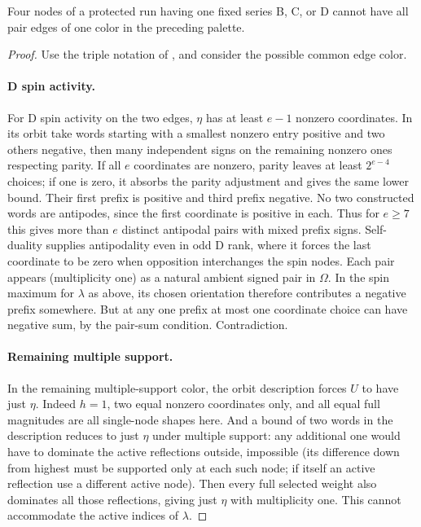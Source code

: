 \begin{proposition}\label{w:signed-obstruction}
Four nodes of a protected run having one fixed series B, C, or D cannot have all pair edges of one color in the preceding palette.
\end{proposition}
\begin{proof}
Use the triple notation of , and consider the possible common edge color.

\paragraph{D spin activity.} For D spin activity on the two edges, \(\eta\) has at least \(e-1\) nonzero coordinates. In its orbit take words starting with a smallest nonzero entry positive and two others negative, then many independent signs on the remaining nonzero ones respecting parity. If all $e$ coordinates are nonzero, parity leaves at least $2^{e-4}$ choices; if one is zero, it absorbs the parity adjustment and gives the same lower bound. Their first prefix is positive and third prefix negative. No two constructed words are antipodes, since the first coordinate is positive in each. Thus for $e\ge7$ this gives more than $e$ distinct antipodal pairs with mixed prefix signs. Self-duality supplies antipodality even in odd D rank, where it forces the last coordinate to be zero when opposition interchanges the spin nodes. Each pair appears (multiplicity one) as a natural ambient signed pair in \(\Omega\). In the spin maximum for \(\lambda\) as above, its chosen orientation therefore contributes a negative prefix somewhere. But at any one prefix at most one coordinate choice can have negative sum, by the pair-sum condition. Contradiction.

\paragraph{Remaining multiple support.} In the remaining multiple-support color, the orbit description forces \(U\) to have just \(\eta\). Indeed \(h=1\), two equal nonzero coordinates only, and all equal full magnitudes are all single-node shapes here. And a bound of two words in the description reduces to just \(\eta\) under multiple support: any additional one would have to dominate the active reflections outside, impossible (its difference down from highest must be supported only at each such node; if itself an active reflection use a different active node). Then every full selected weight also dominates all those reflections, giving just \(\eta\) with multiplicity one. This cannot accommodate the active indices of \(\lambda\).


\end{proof}

